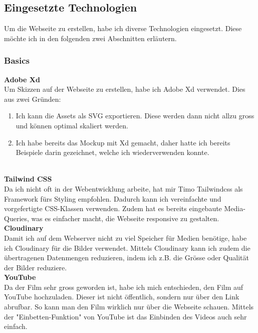 \documentclass[11pt]{article}
\begin{document}
    \subsection{Eingesetzte Technologien}
    Um die Webseite zu erstellen, habe ich diverse Technologien eingesetzt. Diese möchte ich in den folgenden zwei Abschnitten erläutern.

    \subsubsection{Basics}
    \textbf{Adobe Xd}\\
    Um Skizzen auf der Webseite zu erstellen, habe ich Adobe Xd verwendet. Dies aus zwei Gründen:
    \begin{enumerate}
        \item Ich kann die Assets als SVG exportieren. Diese werden dann nicht allzu gross und können optimal skaliert werden.
        \item Ich habe bereits das Mockup mit Xd gemacht, daher hatte ich bereits Beispiele darin gezeichnet, welche ich wiederverwenden konnte.
    \end{enumerate}\\
    \textbf{Tailwind CSS}\\
    Da ich nicht oft in der Webentwicklung arbeite, hat mir Timo Tailwindcss als Framework fürs Styling empfohlen. Dadurch kann ich vereinfachte
    und vorgefertigte CSS-Klassen verwenden. Zudem hat es bereits eingebaute Media-Queries, was es einfacher macht, die Webseite responsive
    zu gestalten.\\
    \textbf{Cloudinary}\\
    Damit ich auf dem Webserver nicht zu viel Speicher für Medien benötige, habe ich Cloudinary für die Bilder verwendet. Mittels Cloudinary
    kann ich zudem die übertragenen Datenmengen reduzieren, indem ich z.B. die Grösse oder Qualität der Bilder reduziere.\\
    \textbf{YouTube}\\
    Da der Film sehr gross geworden ist, habe ich mich entschieden, den Film auf YouTube hochzuladen. Dieser ist nicht öffentlich, sondern nur
    über den Link abrufbar. So kann man den Film wirklich nur über die Webseite schauen. Mittels der "Einbetten-Funktion" von YouTube ist
    das Einbinden des Videos auch sehr einfach.

\end{document}
